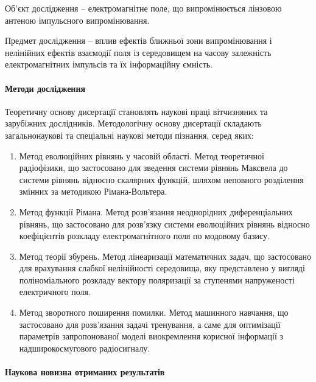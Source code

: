 Об’єкт дослідження -- електромагнітне поле, що випромінюється лінзовою антеною 
імпульсного випромінювання.

Предмет дослідження -- вплив ефектів ближньої зони випромінювання і нелінійних 
ефектів взаємодії поля із середовищем на часову залежність
електромагнітних імпульсів та їх інформаційну ємність.

\paragraph{Методи дослідження}

Теоретичну основу дисертації становлять наукові праці вітчизняних та 
зарубіжних дослідників. Методологічну основу дисертації складають 
загальнонаукові та спеціальні наукові методи пізнання, серед яких:

\begin{enumerate}

\item Метод еволюційних рівнянь у часовій області. Метод теоретичної 
радіофізики, що застосовано для зведення системи рівнянь Максвела до 
системи рівнянь відносно скалярних функцій, шляхом неповного розділення 
змінних за методикою Рімана-Вольтера.

\item Метод функції Рімана. Метод розв'язання неоднорідних 
диференціальних рівнянь, що застосовано для розв'язку системи еволюційних 
рівнянь відносно коефіцієнтів розкладу електромагнітного поля по модовому 
базису.

\item Метод теорії збурень. Метод лінеаризації математичних задач, що 
застосовано для врахування слабкої нелінійності середовища, яку представлено 
у вигляді поліноміального розкладу вектору поляризації за ступенями 
напруженості електричного поля.

\item Метод зворотного поширення помилки. Метод машинного навчання,
що застосовано для розв'язання задачі тренування, а саме для 
оптимізації параметрів запропонованої моделі виокремлення корисної 
інформації з надширокосмугового радіосигналу.

\end{enumerate}

\paragraph{Наукова новизна отриманих результатів}

